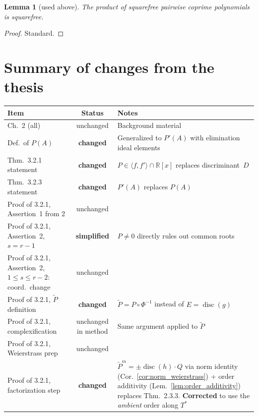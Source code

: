 \documentclass[11pt]{article}
\theoremstyle{plain}
\newtheorem{lemma}[theorem]{Lemma}
\theoremstyle{definition}
\newcommand{\R}{\mathbb{R}}
\DeclareMathOperator{\disc}{disc}
\begin{document}
\begin{lemma}[used above]
\label{lem:prod_squarefree}
The product of squarefree pairwise coprime polynomials is squarefree.
\end{lemma}
\begin{proof}
Standard.
\end{proof}

\section{Summary of changes from the thesis}
\label{sec:summary}

\begin{center}
\begin{tabular}{|l|c|p{7cm}|}
\hline
\textbf{Item} & \textbf{Status} & \textbf{Notes} \\
\hline
Ch.~2 (all) & unchanged & Background material \\
\hline
Def.\ of $P(A)$ & \textbf{changed} & Generalized to $P'(A)$ with
  elimination ideal elements \\
\hline
Thm.~3.2.1 statement & \textbf{changed} & $P \in \langle f, f' \rangle \cap \R[x]$
  replaces discriminant~$D$ \\
\hline
Thm.~3.2.3 statement & \textbf{changed} & $P'(A)$ replaces $P(A)$ \\
\hline
Proof of 3.2.1, Assertion~1 from 2 & unchanged & \\
\hline
Proof of 3.2.1, Assertion~2, $s = r-1$ & \textbf{simplified} & $P \ne 0$
  directly rules out common roots \\
\hline
Proof of 3.2.1, Assertion~2, $1 \le s \le r-2$:
  coord.\ change & unchanged & \\
\hline
Proof of 3.2.1, $\widetilde{P}$ definition & \textbf{changed} &
  $\widetilde{P} = P \circ \Phi^{-1}$ instead of $E = \disc(g)$ \\
\hline
Proof of 3.2.1, complexification & unchanged in method &
  Same argument applied to $\widetilde{P}$ \\
\hline
Proof of 3.2.1, Weierstrass prep & unchanged & \\
\hline
Proof of 3.2.1, factorization step & \textbf{changed} &
  $\widetilde{P}^m = \pm\disc(h) \cdot Q$ via norm identity
  (Cor.~\ref{cor:norm_weierstrass}) + order additivity
  (Lem.~\ref{lem:order_additivity}) replaces Thm.~2.3.3.
  \textbf{Corrected} to use the \emph{ambient} order along $T^*$

\end{tabular}
\end{center}
\end{document}
